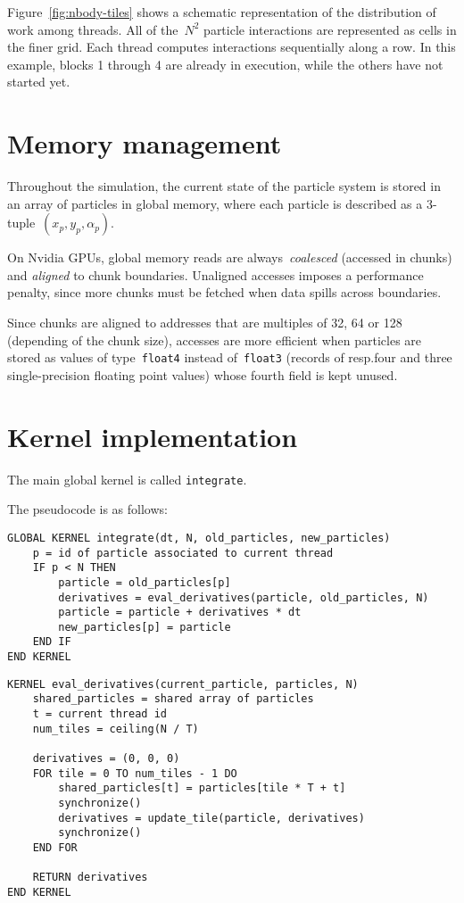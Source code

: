 Figure~\ref{fig:nbody-tiles} shows a schematic representation
of the distribution of work among threads.
All of the~\(N^2\) particle interactions are represented
as cells in the finer grid.
Each thread computes interactions sequentially along a row.
In this example, blocks 1 through 4 are already in execution,
while the others have not started yet.

\section{Memory management}
\label{sec:memory-management}

Throughout the simulation,
the current state of the particle system
is stored in an array of particles in global memory,
where each particle is described as a 3-tuple~\((x_p, y_p, α_p)\).

On Nvidia GPUs,
global memory reads are always~\emph{coalesced} (accessed in chunks)
and \emph{aligned} to chunk boundaries.
Unaligned accesses imposes a performance penalty,
since more chunks must be fetched
when data spills across boundaries.

Since chunks are aligned to addresses that are
multiples of 32, 64 or 128 (depending of the chunk size),
accesses are more efficient when particles are stored
as values of type~\texttt{float4} instead of~\texttt{float3}
(records of resp.\@ four and three single-precision floating point values)
whose fourth field is kept unused.


\section{Kernel implementation}
\label{sec:kernel-implementation}

The main global kernel is called \verb!integrate!.

The pseudocode is as follows:

\begin{verbatim}
GLOBAL KERNEL integrate(dt, N, old_particles, new_particles)
    p = id of particle associated to current thread
    IF p < N THEN
        particle = old_particles[p]
        derivatives = eval_derivatives(particle, old_particles, N)
        particle = particle + derivatives * dt
        new_particles[p] = particle
    END IF
END KERNEL
\end{verbatim}

\begin{verbatim}
KERNEL eval_derivatives(current_particle, particles, N)
    shared_particles = shared array of particles
    t = current thread id
    num_tiles = ceiling(N / T)

    derivatives = (0, 0, 0)
    FOR tile = 0 TO num_tiles - 1 DO
        shared_particles[t] = particles[tile * T + t]
        synchronize()
        derivatives = update_tile(particle, derivatives)
        synchronize()
    END FOR

    RETURN derivatives
END KERNEL
\end{verbatim}

